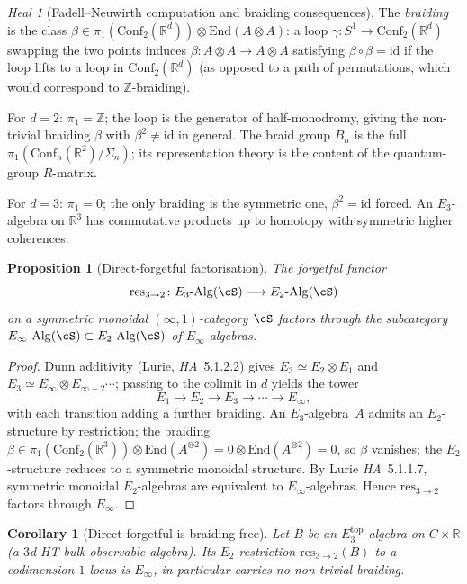 \documentclass[11pt]{article}
\newtheorem{prop}[thm]{Proposition}
\newtheorem{cor}[thm]{Corollary}
\theoremstyle{definition}
\theoremstyle{remark}
\newtheorem{heal}[thm]{Heal}
\newcommand{\bR}{\mathbb{R}}
\newcommand{\bZ}{\mathbb{Z}}
\newcommand{\Conf}{\mathrm{Conf}}
\newcommand{\End}{\mathrm{End}}
\newcommand{\Eone}{E_1}
\newcommand{\Etwo}{E_2}
\newcommand{\Ethree}{E_3}
\newcommand{\Einf}{E_\infty}
\newcommand{\id}{\mathrm{id}}
\begin{document}
\begin{heal}[Fadell--Neuwirth computation and braiding consequences]
The \emph{braiding} is the class
$\beta \in \pi_1(\Conf_2(\bR^d)) \otimes \End(A \otimes A)$:
a loop $\gamma\colon S^1 \to \Conf_2(\bR^d)$ swapping the two points
induces $\beta\colon A \otimes A \to A \otimes A$ satisfying
$\beta \circ \beta = \id$ if the loop lifts to a loop in
$\Conf_2(\bR^d)$ (as opposed to a path of permutations, which would
correspond to $\bZ$-braiding).

For $d = 2$: $\pi_1 = \bZ$; the loop is the generator of
half-monodromy, giving the non-trivial braiding
$\beta$ with $\beta^2 \neq \id$ in general. The braid group $B_n$
is the full $\pi_1(\Conf_n(\bR^2)/\Sigma_n)$; its representation
theory is the content of the quantum-group $R$-matrix.

For $d = 3$: $\pi_1 = 0$; the only braiding is the symmetric
one, $\beta^2 = \id$ forced. An $\Ethree$-algebra on $\bR^3$ has
commutative products up to homotopy with symmetric higher
coherences.

\begin{prop}[Direct-forgetful factorisation]
\label{prop:direct-forgetful}
The forgetful functor
\[
\mathrm{res}_{3 \to 2}\colon \Ethree\text{-}\mathrm{Alg}(\cS)
\longrightarrow \Etwo\text{-}\mathrm{Alg}(\cS)
\]
on a symmetric monoidal $(\infty,1)$-category $\cS$ factors
through the subcategory $\Einf\text{-}\mathrm{Alg}(\cS) \subset
\Etwo\text{-}\mathrm{Alg}(\cS)$ of $\Einf$-algebras.
\end{prop}

\begin{proof}
Dunn additivity (Lurie, \emph{HA}~5.1.2.2) gives
$\Ethree \simeq \Etwo \otimes \Eone$ and
$\Ethree \simeq \Einf \otimes E_{\infty - 2} \cdots$; passing to
the colimit in $d$ yields the tower
\[
\Eone \to \Etwo \to \Ethree \to \cdots \to \Einf,
\]
with each transition adding a further braiding. An
$\Ethree$-algebra~$A$ admits an $\Etwo$-structure by restriction;
the braiding $\beta \in \pi_1(\Conf_2(\bR^3)) \otimes \End(A^{\otimes 2})
= 0 \otimes \End(A^{\otimes 2}) = 0$, so $\beta$ vanishes; the
$\Etwo$-structure reduces to a symmetric monoidal structure. By
Lurie \emph{HA}~5.1.1.7, symmetric monoidal $\Etwo$-algebras are
equivalent to $\Einf$-algebras. Hence $\mathrm{res}_{3 \to 2}$
factors through $\Einf$.
\end{proof}

\begin{cor}[Direct-forgetful is braiding-free]
\label{cor:no-braiding}
Let $B$ be an $\Ethree^{\mathrm{top}}$-algebra on $C \times \bR$
(a $3$d HT bulk observable algebra). Its $\Etwo$-restriction
$\mathrm{res}_{3\to 2}(B)$ to a codimension-$1$ locus is
$\Einf$, in particular carries no non-trivial braiding.
\end{cor}


\end{heal}
\end{document}
